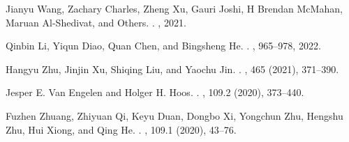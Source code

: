 \documentclass[11pt]{article}
\begin{document}
\begin{thebibliography}{10}
Jianyu Wang, Zachary Charles, Zheng Xu, Gauri Joshi, H Brendan McMahan, Maruan Al-Shedivat, and Others.
.
, 2021.

Qinbin Li, Yiqun Diao, Quan Chen, and Bingsheng He.
.
, 965--978, 2022.

Hangyu Zhu, Jinjin Xu, Shiqing Liu, and Yaochu Jin.
.
, 465 (2021), 371--390.

Jesper E. Van Engelen and Holger H. Hoos.
.
, 109.2 (2020), 373--440.

Fuzhen Zhuang, Zhiyuan Qi, Keyu Duan, Dongbo Xi, Yongchun Zhu, Hengshu Zhu, Hui Xiong, and Qing He.
.
, 109.1 (2020), 43--76.


\end{thebibliography}
\end{document}
